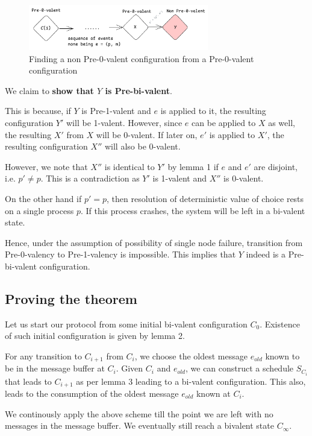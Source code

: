 \begin{figure}[H]
    \centering
    \includegraphics[width=0.7\textwidth]{general-problems/assets/flp-pre-0-valent-to-non-pre-0-valent.png}
    \caption{Finding a non Pre-0-valent configuration from a Pre-0-valent configuration}
    \label{fig:finding-non-pre-0-valent}
\end{figure}

We claim to \textbf{show that $Y$ is Pre-bi-valent}.

This is because, if $Y$ is Pre-1-valent and $e$ is applied to it, the resulting configuration $Y'$ will be 1-valent. However, since $e$ can be applied to $X$ as well, the resulting $X'$ from $X$ will be 0-valent. If later on, $e'$ is applied to $X'$, the resulting configuration $X''$ will also be 0-valent.

However, we note that $X''$ is identical to $Y'$ by lemma 1 if $e$ and $e'$ are disjoint, i.e. $p' \ne p$. This is a contradiction as $Y'$ is 1-valent and $X''$ is 0-valent.

On the other hand if $p' = p$, then resolution of deterministic value of choice rests on a single process $p$. If this process crashes, the system will be left in a bi-valent state.

Hence, under the assumption of possibility of single node failure, transition from Pre-0-valency to Pre-1-valency is impossible. This implies that $Y$ indeed is a Pre-bi-valent configuration.

\subsection{Proving the theorem}
Let us start our protocol from some initial bi-valent configuration $C_0$. Existence of such initial configuration is given by lemma 2.

For any transition to $C_{i+1}$ from $C_{i}$, we choose the oldest message $e_{old}$ known to be in the message buffer at $C_i$. Given $C_i$ and $e_{old}$, we can construct a schedule $S_{C_i}$ that leads to $C_{i+1}$ as per lemma 3 leading to a bi-valent configuration. This also, leads to the consumption of the oldest message $e_{old}$ known at $C_i$.

We continously apply the above scheme till the point we are left with no messages in the message buffer. We eventually still reach a bivalent state $C_{\infty}$.

